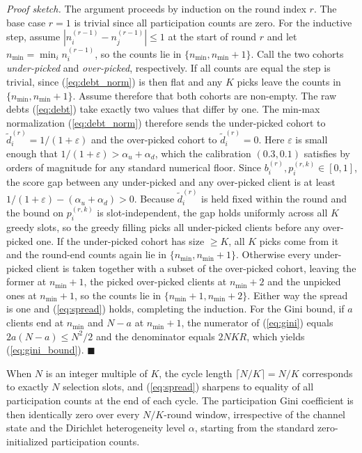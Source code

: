 \documentclass[journal]{IEEEtran}
\newcommand{\revIVE}[1]{#1}
\newcommand{\rev}[1]{#1}
\begin{document}
\textit{Proof sketch.} The argument proceeds by induction on the round index $r$. The base case $r = 1$ is trivial since all participation counts are zero. For the inductive step, assume $|n_i^{(r-1)} - n_j^{(r-1)}| \le 1$ at the start of round $r$ and let $n_{\min} = \min_i n_i^{(r-1)}$, so the counts lie in $\{n_{\min}, n_{\min}+1\}$. Call the two cohorts \emph{under-picked} and \emph{over-picked}, respectively. \rev{If all counts are equal the step is trivial, since (\ref{eq:debt_norm}) is then flat and any $K$ picks leave the counts in $\{n_{\min}, n_{\min}+1\}$. Assume therefore that both cohorts are non-empty.} The raw debts (\ref{eq:debt}) take exactly two values that differ by one. The min-max normalization (\ref{eq:debt_norm}) therefore sends the under-picked cohort to $\tilde{d}_i^{(r)} = 1/(1+\varepsilon)$ and the over-picked cohort to $\tilde{d}_i^{(r)} = 0$. \revIVE{Here $\varepsilon$ is small enough that $1/(1+\varepsilon) > \alpha_u + \alpha_d$, which the calibration $(0.3, 0.1)$ satisfies by orders of magnitude for any standard numerical floor.} Since $b_i^{(r)}, p_i^{(r,k)} \in [0,1]$, the score gap between any under-picked and any over-picked client is at least $1/(1+\varepsilon) - (\alpha_u + \alpha_d) > 0$. \revIVE{Because $\tilde{d}_i^{(r)}$ is held fixed within the round and the bound on $p_i^{(r,k)}$ is slot-independent, the gap holds uniformly across all $K$ greedy slots,} so the greedy filling picks all under-picked clients before any over-picked one. If the under-picked cohort has size $\ge K$, all $K$ picks come from it and the round-end counts again lie in $\{n_{\min}, n_{\min}+1\}$. Otherwise every under-picked client is taken together with a subset of the over-picked cohort, leaving the former at $n_{\min}+1$, the picked over-picked clients at $n_{\min}+2$ and the unpicked ones at $n_{\min}+1$, so the counts lie in $\{n_{\min}+1, n_{\min}+2\}$. Either way the spread is one and (\ref{eq:spread}) holds, completing the induction. For the Gini bound, if $a$ clients end at $n_{\min}$ and $N-a$ at $n_{\min}+1$, the numerator of (\ref{eq:gini}) equals $2a(N-a) \le N^2/2$ and the denominator equals $2NKR$, which yields (\ref{eq:gini_bound}). \hfill$\blacksquare$

When $N$ is an integer multiple of $K$, the cycle length $\lceil N/K \rceil = N/K$ corresponds to exactly $N$ selection slots, and (\ref{eq:spread}) sharpens to equality of all participation counts at the end of each cycle. The participation Gini coefficient is then identically zero over every $N/K$-round window, irrespective of the channel state and the Dirichlet heterogeneity level $\alpha$, starting from the standard zero-initialized participation counts.
\end{document}
